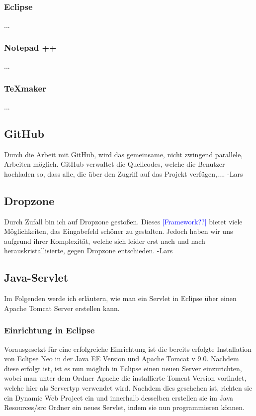 \documentclass[12pt,a4paper,bibliography=totocnumbered,listof=totocnumbered]{scrartcl}
\begin{document}
\subsubsection{Eclipse}
...

\subsubsection{Notepad ++}
...

\subsubsection{TeXmaker}
...

\subsection{GitHub}
Durch die Arbeit mit GitHub, wird das gemeinsame, nicht zwingend parallele, Arbeiten möglich.
GitHub verwaltet die Quellcodes, welche die Benutzer hochladen so, dass
alle, die über den Zugriff auf das Projekt verfügen,.... -Lars

\subsection{Dropzone}
Durch Zufall bin ich auf Dropzone gestoßen.
Dieses \textcolor{blue}{[Framework??]} bietet viele Möglichkeiten, 
das Eingabefeld schöner zu gestalten.
Jedoch haben wir uns aufgrund ihrer Komplexität, welche sich leider erst
nach und nach herauskristallisierte, gegen Dropzone entschieden. -Lars

\subsection{Java-Servlet}
Im Folgenden werde ich erläutern, wie man ein Servlet in Eclipse über einen Apache Tomcat Server erstellen kann.

\subsubsection{Einrichtung in Eclipse}
Vorausgesetzt für eine erfolgreiche Einrichtung ist die bereits erfolgte Installation von Eclipse Neo in der Java EE Version und Apache Tomcat v 9.0. 
Nachdem  diese erfolgt ist, ist es nun möglich in Eclipse einen neuen Server einzurichten, wobei man unter dem Ordner Apache die installierte Tomcat Version vorfindet, welche hier  als Servertyp verwendet wird.
Nachdem dies geschehen ist, richten sie ein Dynamic Web Project ein und innerhalb desselben erstellen sie im Java Resources/src  Ordner ein neues Servlet, indem sie nun programmieren können.
\end{document}
